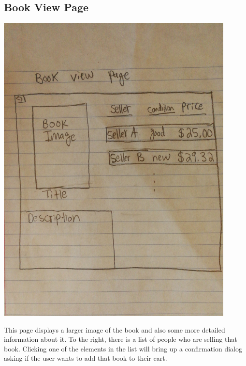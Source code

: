 \documentclass[12pt]{article}
\begin{document}
		\subsection{Book View Page}
		\includegraphics[width=12cm]{book_view_page.eps}
			\par
			This page displays a larger image of the book and also some more detailed information about it. 
			To the right, there is a list of people who are selling that book. 
			Clicking one of the elements in the list will bring up a confirmation dialog asking if the user wants to add that book to their cart.
\end{document}
